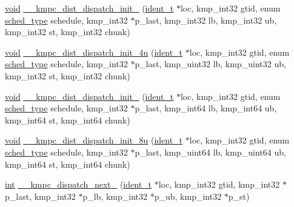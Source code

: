 \begin{DoxyCompactItemize}
\item 
\hyperlink{ittnotify__static_8h_af941d56e55e3c5465135b60c4d6343ed}{void} \hyperlink{group__WORK__SHARING_ga9a4e5434d7a476580c6ef7ad2c776bb5}{\-\_\-\-\_\-kmpc\-\_\-dist\-\_\-dispatch\-\_\-init\-\_} (\hyperlink{group__BASIC__TYPES_ga690fda6b92f039a72db263c6b4394ddb}{ident\-\_\-t} $\ast$loc, kmp\-\_\-int32 gtid, enum \hyperlink{group__WORK__SHARING_gadcaf200537aaa0218a60c398438f81be}{sched\-\_\-type} schedule, kmp\-\_\-int32 $\ast$p\-\_\-last, kmp\-\_\-int32 lb, kmp\-\_\-int32 ub, kmp\-\_\-int32 st, kmp\-\_\-int32 chunk)
\item 
\hyperlink{ittnotify__static_8h_af941d56e55e3c5465135b60c4d6343ed}{void} \hyperlink{group__WORK__SHARING_ga495d52d32fed082b74595e0c28ccbc11}{\-\_\-\-\_\-kmpc\-\_\-dist\-\_\-dispatch\-\_\-init\-\_\-4u} (\hyperlink{group__BASIC__TYPES_ga690fda6b92f039a72db263c6b4394ddb}{ident\-\_\-t} $\ast$loc, kmp\-\_\-int32 gtid, enum \hyperlink{group__WORK__SHARING_gadcaf200537aaa0218a60c398438f81be}{sched\-\_\-type} schedule, kmp\-\_\-int32 $\ast$p\-\_\-last, kmp\-\_\-uint32 lb, kmp\-\_\-uint32 ub, kmp\-\_\-int32 st, kmp\-\_\-int32 chunk)
\item 
\hyperlink{ittnotify__static_8h_af941d56e55e3c5465135b60c4d6343ed}{void} \hyperlink{group__WORK__SHARING_ga95541083a047e8ca4915e39b41fa1143}{\-\_\-\-\_\-kmpc\-\_\-dist\-\_\-dispatch\-\_\-init\-\_} (\hyperlink{group__BASIC__TYPES_ga690fda6b92f039a72db263c6b4394ddb}{ident\-\_\-t} $\ast$loc, kmp\-\_\-int32 gtid, enum \hyperlink{group__WORK__SHARING_gadcaf200537aaa0218a60c398438f81be}{sched\-\_\-type} schedule, kmp\-\_\-int32 $\ast$p\-\_\-last, kmp\-\_\-int64 lb, kmp\-\_\-int64 ub, kmp\-\_\-int64 st, kmp\-\_\-int64 chunk)
\item 
\hyperlink{ittnotify__static_8h_af941d56e55e3c5465135b60c4d6343ed}{void} \hyperlink{group__WORK__SHARING_ga5784024653468c0445601c91da959e0f}{\-\_\-\-\_\-kmpc\-\_\-dist\-\_\-dispatch\-\_\-init\-\_\-8u} (\hyperlink{group__BASIC__TYPES_ga690fda6b92f039a72db263c6b4394ddb}{ident\-\_\-t} $\ast$loc, kmp\-\_\-int32 gtid, enum \hyperlink{group__WORK__SHARING_gadcaf200537aaa0218a60c398438f81be}{sched\-\_\-type} schedule, kmp\-\_\-int32 $\ast$p\-\_\-last, kmp\-\_\-uint64 lb, kmp\-\_\-uint64 ub, kmp\-\_\-int64 st, kmp\-\_\-int64 chunk)
\item 
\hyperlink{ittnotify__static_8h_a8b8dcd723308a8cb5d84277c7a3fff70}{int} \hyperlink{group__WORK__SHARING_ga5671ff45051907f76cc3d214e1de854b}{\-\_\-\-\_\-kmpc\-\_\-dispatch\-\_\-next\-\_} (\hyperlink{group__BASIC__TYPES_ga690fda6b92f039a72db263c6b4394ddb}{ident\-\_\-t} $\ast$loc, kmp\-\_\-int32 gtid, kmp\-\_\-int32 $\ast$p\-\_\-last, kmp\-\_\-int32 $\ast$p\-\_\-lb, kmp\-\_\-int32 $\ast$p\-\_\-ub, kmp\-\_\-int32 $\ast$p\-\_\-st)

\end{DoxyCompactItemize}
